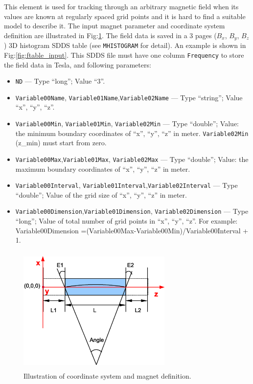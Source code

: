 This element is used for tracking through an arbitrary magnetic field
when its values are known at regularly spaced grid points and it is
hard to find a suitable model to describe it. The input magnet
parameter and coordinate system definition are illustrated in
Fig:\ref{fig:ftable_mag}. The field data is saved in a 3 pages ($B_x$,
$B_y$, $B_z$) 3D histogram SDDS table (see \verb|MHISTOGRAM| for detail).
An example is shown in Fig:\ref{fig:ftable_input}.
This SDDS file must have one column \verb|Frequency| to store the
field data in Tesla, and following parameters:

\begin{itemize} 
\item \verb|ND| --- Type ``long''; Value ``3''.
\item \verb|Variable00Name|, \verb|Variable01Name|,\verb|Variable02Name| 
      --- Type ``string''; Value ``x'', ``y'', ``z''.
\item \verb|Variable00Min|, \verb|Variable01Min|, \verb|Variable02Min|
      --- Type ``double''; Value: the minimum boundary coordinates of
      ``x'', ``y'', ``z'' in meter. \verb|Variable02Min| (z\_min) must start from zero.
\item \verb|Variable00Max|,\verb|Variable01Max|, \verb|Variable02Max| 
      --- Type ``double''; Value: the maximum boundary coordinates of 
      ``x'', ``y'', ``z'' in meter.
\item \verb|Variable00Interval|, \verb|Variable01Interval|,\verb|Variable02Interval|
      --- Type ``double''; Value of the grid size of ``x'', ``y'', ``z'' in meter.  
\item \verb|Variable00Dimension|,\verb|Variable01Dimension|, \verb|Variable02Dimension|
      --- Type ``long''; Value of total number of grid points in
      ``x'', ``y'', ``z''.  For example: Variable00Dimension
      =(Variable00Max-Variable00Min)/Variable00Interval + 1.
\end{itemize}

\begin{figure}[htbp] 
  \begin{center}
  \includegraphics[width=3in,height=2.5in]{ftable-fig1.eps}
  \caption{\label{fig:ftable_mag} Illustration of coordinate
      system and magnet definition.}  
   \end{center} 
\end{figure}

